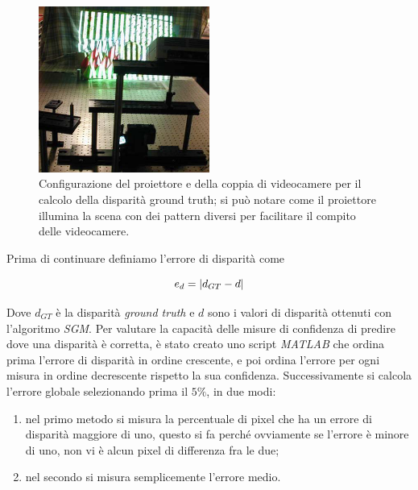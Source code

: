 \documentclass[12pt]{report}
\DeclarePairedDelimiter{\abs}{\lvert}{\rvert}    %
\begin{document}
		\begin{figure}
			\includegraphics[width=0.5\textwidth]{./figures/ground_truth.png}
			\caption{Configurazione del proiettore e della coppia di videocamere per il calcolo della disparità ground truth; si può notare come il proiettore illumina la scena con dei pattern diversi per facilitare il compito delle videocamere.}
			\label{fig:groundtruth}
		\end{figure}
		
		\noindent Prima di continuare definiamo l'errore di disparità come
		
		\begin{equation}
			e_{d}=\abs{d_{GT}-d}
			\label{eq:errore}
		\end{equation} 
		
		\noindent Dove $d_{GT}$ è la disparità \textit{ground truth} e $d$ sono i valori di disparità ottenuti con l'algoritmo \textit{SGM}. \newline Per valutare la capacità delle misure di confidenza di predire dove una disparità è corretta, è stato creato uno script \textit{MATLAB} che ordina prima l'errore di disparità in ordine crescente, e poi ordina l'errore per ogni misura in ordine decrescente rispetto la sua confidenza. Successivamente si calcola l'errore globale selezionando prima il $5\%$, in due modi: 
		
		\begin{enumerate}
			\item nel primo metodo si misura la percentuale di pixel che ha un errore di disparità maggiore di uno, questo si fa perché ovviamente se l'errore è minore di uno, non vi è alcun pixel di differenza fra le due;
			
			\item nel secondo si misura semplicemente l'errore medio.
			\label{enum:errore}
		\end{enumerate}
				
\end{document}
